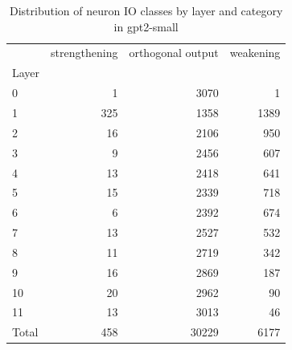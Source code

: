 \begin{table}
\caption{Distribution of neuron IO classes by layer and category in gpt2-small}
\label{tab:gpt2-small}
\begin{tabular}{lrrr}
 & strengthening & orthogonal output & weakening \\
Layer &  &  &  \\
0 & 1 & 3070 & 1 \\
1 & 325 & 1358 & 1389 \\
2 & 16 & 2106 & 950 \\
3 & 9 & 2456 & 607 \\
4 & 13 & 2418 & 641 \\
5 & 15 & 2339 & 718 \\
6 & 6 & 2392 & 674 \\
7 & 13 & 2527 & 532 \\
8 & 11 & 2719 & 342 \\
9 & 16 & 2869 & 187 \\
10 & 20 & 2962 & 90 \\
11 & 13 & 3013 & 46 \\
Total & 458 & 30229 & 6177 \\
\end{tabular}
\end{table}
